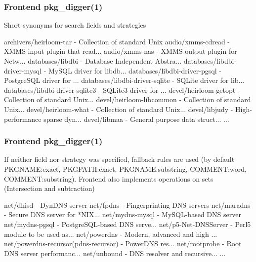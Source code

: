 \documentclass[hyperref=unicode,ascii,xcolor=dvipsnames]{beamer}
\begin{document}

\begin{frame}[fragile]
  \frametitle{Frontend pkg\_digger(1)}
  \begin{block}{Short synonyms for search fields and strategies}
    \begin{Code}{}
archivers/heirloom-tar -   Collection of standard Unix
audio/xmms-cdread      -   XMMS input plugin that read...
audio/xmms-nas         -   XMMS output plugin for Netw...
databases/libdbi       -   Database Independent Abstra...
databases/libdbi-driver-mysql - MySQL driver for libdb...
databases/libdbi-driver-pgsql - PostgreSQL driver for ...
databases/libdbi-driver-sqlite - SQLite driver for lib...
databases/libdbi-driver-sqlite3 -  SQLite3 driver for ...
devel/heirloom-getopt  -   Collection of standard Unix...
devel/heirloom-libcommon - Collection of standard Unix...
devel/heirloom-what    -   Collection of standard Unix...
devel/libjudy          -   High-performance sparse dyn...
devel/libmaa           -   General purpose data struct...
...
\prompt{#}
    \end{Code}
  \end{block}
\end{frame}


\begin{frame}[fragile]
  \frametitle{Frontend pkg\_digger(1)}
{\small If neither field nor strategy was specified, fallback rules are used
(by default PKGNAME:exact, PKGPATH:exact,
PKGNAME:substring, COMMENT:word, COMMENT:substring). Frontend also
implements operations on sets (Intersection and subtraction)}
\vspace{-0.3cm}
\begin{block}{}
    \begin{Code}{}
net/dhisd              -   DynDNS server
net/fpdns              -   Fingerprinting DNS servers
net/maradns            -   Secure DNS server for *NIX...
net/mydns-mysql        -   MySQL-based DNS server
net/mydns-pgsql        -   PostgreSQL-based DNS serve...
net/p5-Net-DNSServer   -   Perl5 module to be used as...
net/powerdns           -   Modern, advanced and high ...
net/powerdns-recursor(pdns-recursor) -   PowerDNS res...
net/rootprobe          -   Root DNS server performanc...
net/unbound            -   DNS resolver and recursive...
...
\prompt{#}
    \end{Code}
  \end{block}
\end{frame}
\end{document}
